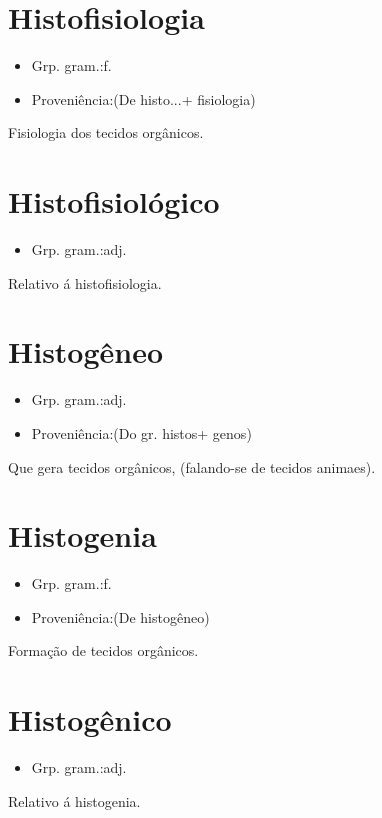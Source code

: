 \documentclass{article}
\begin{document}
\section{Histofisiologia}
\begin{itemize}
\item {Grp. gram.:f.}
\end{itemize}
\begin{itemize}
\item {Proveniência:(De \textunderscore histo...\textunderscore  + \textunderscore fisiologia\textunderscore )}
\end{itemize}
Fisiologia dos tecidos orgânicos.
\section{Histofisiológico}
\begin{itemize}
\item {Grp. gram.:adj.}
\end{itemize}
Relativo á histofisiologia.
\section{Histogêneo}
\begin{itemize}
\item {Grp. gram.:adj.}
\end{itemize}
\begin{itemize}
\item {Proveniência:(Do gr. \textunderscore histos\textunderscore  + \textunderscore genos\textunderscore )}
\end{itemize}
Que gera tecidos orgânicos, (falando-se de tecidos animaes).
\section{Histogenia}
\begin{itemize}
\item {Grp. gram.:f.}
\end{itemize}
\begin{itemize}
\item {Proveniência:(De \textunderscore histogêneo\textunderscore )}
\end{itemize}
Formação de tecidos orgânicos.
\section{Histogênico}
\begin{itemize}
\item {Grp. gram.:adj.}
\end{itemize}
Relativo á histogenia.
\end{document}

